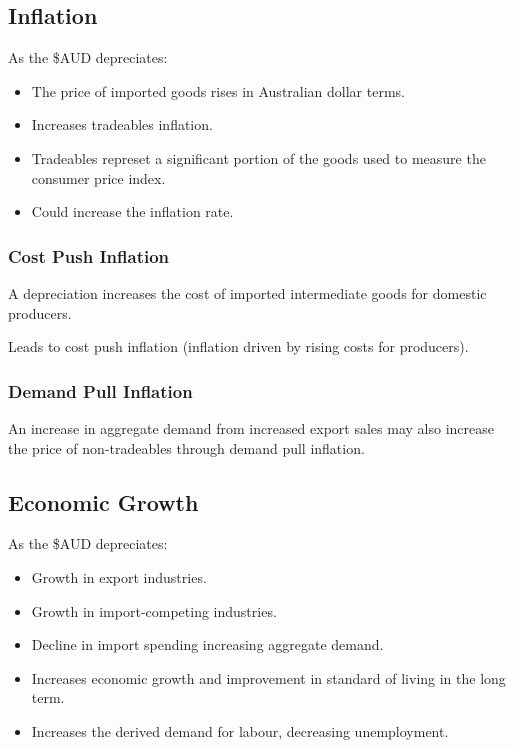 \documentclass[a4paper,11pt]{report}
\begin{document}
\subsection{Inflation}

As the \$AUD depreciates:

\begin{itemize}
\item The price of imported goods rises in Australian dollar terms.
\item Increases tradeables inflation.
\item Tradeables represet a significant portion of the goods used to measure
	the consumer price index.
\item Could increase the inflation rate.
\end{itemize}

\subsubsection{Cost Push Inflation}

A depreciation increases the cost of imported intermediate goods for domestic
producers.

Leads to cost push inflation (inflation driven by rising costs for producers).

\subsubsection{Demand Pull Inflation}

An increase in aggregate demand from increased export sales may also increase
the price of non-tradeables through demand pull inflation.

\subsection{Economic Growth}

As the \$AUD depreciates:

\begin{itemize}
\item Growth in export industries.
\item Growth in import-competing industries.
\item Decline in import spending increasing aggregate demand.
\item Increases economic growth and improvement in standard of living in the
	long term.
\item Increases the derived demand for labour, decreasing unemployment.
\end{itemize}
\end{document}

